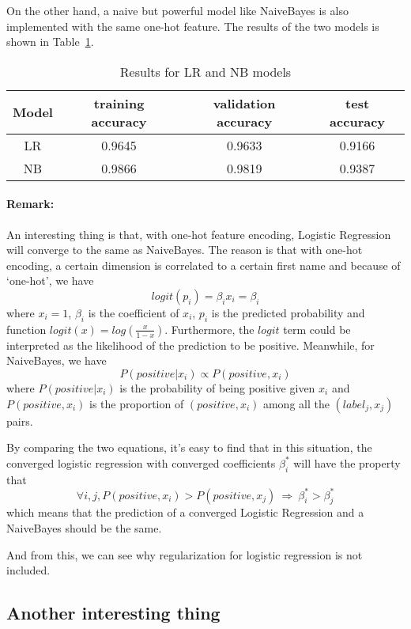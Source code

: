 \documentclass{article}
\begin{document}
On the other hand, a naive but powerful model like NaiveBayes is also implemented with the same one-hot feature. The results of the two models is shown in Table~\ref{tab-3}.
\begin{table}[ht]
\centering
\caption{Results for LR and NB models}
\label{tab-3}
\begin{tabular}{cccc}
\toprule
Model & training accuracy & validation accuracy & test accuracy \\
\midrule
LR & 0.9645 & 0.9633 & 0.9166 \\
NB & 0.9866 & 0.9819 & 0.9387 \\
\bottomrule
\end{tabular}
\end{table}

\paragraph{Remark:} 
An interesting thing is that, with one-hot feature encoding, Logistic Regression will converge to the same as NaiveBayes. The reason is that with one-hot encoding, a certain dimension is correlated to a certain first name and because of `one-hot', we have \[
logit(p_i) = \beta_i x_i = \beta_i\] where $x_i = 1$, $\beta_i$ is the coefficient of $x_i$, $p_i$ is the predicted probability and function $logit(x) = log(\frac{x}{1-x})$. Furthermore, the $logit$ term could be interpreted as the likelihood of the prediction to be positive. Meanwhile, for NaiveBayes, we have \[
P(positive|x_i) \propto P(positive, x_i)\] where $P(positive|x_i)$ is the probability of being positive given $x_i$ and $P(positive, x_i)$ is the proportion of $(positive, x_i)$ among all the $(label_j, x_j)$ pairs.

By comparing the two equations, it's easy to find that in this situation, the converged logistic regression with converged coefficients $\beta^*_i$ will have the property that \[
\forall i, j, P(positive, x_i) > P(positive, x_j) ~\Rightarrow ~\beta^*_i > \beta^*_j\] which means that the prediction of a converged Logistic Regression and a NaiveBayes should be the same.

And from this, we can see why regularization for logistic regression is not included.

\subsection{Another interesting thing}
\end{document}
